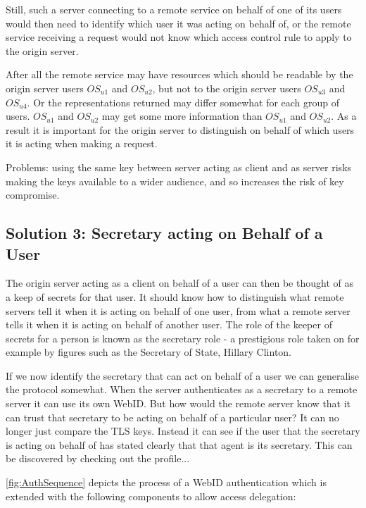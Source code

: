 \documentclass[a4paper]{llncs}
\begin{document}
Still, such a server connecting to a remote service on behalf of one of its users would then need to identify which user it was acting on behalf of, or the remote service receiving a request would not know which access control rule to apply to the origin server.

After all the remote service may have resources which should be readable by the origin server users $OS_{u1}$ and $OS_{u2}$, but not to the origin server users $OS_{u3}$ and $OS_{u4}$.
Or the representations returned may differ somewhat for each group of users.
$OS_{u1}$ and $OS_{u2}$ may get some more information than $OS_{u1}$ and $OS_{u2}$.
As a result it is important for the origin server to distinguish on behalf of which users it is acting when making a request.

Problems: using the same key between server acting as client and as server risks making the keys available to a wider audience, and so increases the risk of key compromise. 


\subsection{Solution 3: Secretary acting on Behalf of a User}

The origin server acting as a client on behalf of a user can then be thought of as a keep of secrets for that user.
It should know how to distinguish what remote servers tell it when it is acting on behalf of one user, from what a remote server tells it when it is acting on behalf of another user.
The role of the keeper of secrets for a person is known as the secretary role - a prestigious role taken on for example by figures such as the Secretary of State, Hillary Clinton.

If we now identify the secretary that can act on behalf of a user we can generalise the protocol somewhat.
When the server authenticates as a secretary to a remote server it can use its own WebID.
But how would the remote server know that it can trust that secretary to be acting on behalf of a particular user?
It can no longer just compare the TLS keys.
Instead it can see if the user that the secretary is acting on behalf of has stated clearly that that agent is its secretary.
This can be discovered by checking out the profile... 

\autoref{fig:AuthSequence} depicts the process of a WebID authentication which is extended with the following components to allow access delegation:
\end{document}
